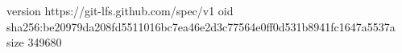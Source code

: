 version https://git-lfs.github.com/spec/v1
oid sha256:be20979da208fd5511016bc7ea46e2d3c77564e0ff0d531b8941fc1647a5537a
size 349680
